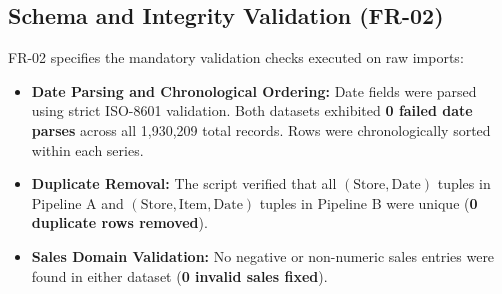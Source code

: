 \documentclass[11pt,a4paper]{article}
\begin{document}
\subsection{Schema and Integrity Validation (FR-02)}
FR-02 specifies the mandatory validation checks executed on raw imports:
\begin{itemize}
    \item \textbf{Date Parsing and Chronological Ordering:} Date fields were parsed using strict ISO-8601 validation. Both datasets exhibited \textbf{0 failed date parses} across all 1,930,209 total records. Rows were chronologically sorted within each series.
    \item \textbf{Duplicate Removal:} The script verified that all $(\text{Store}, \text{Date})$ tuples in Pipeline A and $(\text{Store}, \text{Item}, \text{Date})$ tuples in Pipeline B were unique (\textbf{0 duplicate rows removed}).
    \item \textbf{Sales Domain Validation:} No negative or non-numeric sales entries were found in either dataset (\textbf{0 invalid sales fixed}).
\end{itemize}
\end{document}
